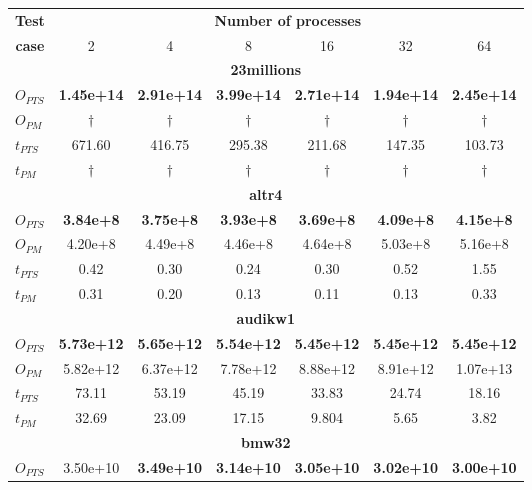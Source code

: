 \documentclass[fleqn,12pt,twoside]{article}
\begin{document}
\begin{table}[hbt]
\begin{center}
  \begin{tabular}{|l||c|c|c|c|c|c|}
    \hline
    \multicolumn{1}{|c||}{{\bf Test}} &
    \multicolumn{6}{c|}{{\bf Number of processes}}\\
    \cline{2-7}
     \multicolumn{1}{|c||}{{\bf case}} & 2 & 4 & 8 & 16 & 32 & 64 \\
    \hline
    \hline
    \multicolumn{7}{|c|}{{\bf 23millions}} \\
    \hline
    $O_{PTS}$ & \textbf{1.45e+14} & \textbf{2.91e+14} & \textbf{3.99e+14} & \textbf{2.71e+14} & \textbf{1.94e+14} & \textbf{2.45e+14} \\
    $O_{PM}$  & $\dag$  &$\dag$ & $\dag$ & $\dag$ & $\dag$ & $\dag$   \\
    $t_{PTS}$ & 671.60 & 416.75 & 295.38 & 211.68 & 147.35 & 103.73 \\
    $t_{PM}$  & $\dag$  &$\dag$ & $\dag$ & $\dag$ & $\dag$ & $\dag$ \\
    \hline
    \multicolumn{7}{|c|}{{\bf altr4}} \\
    \hline
    $O_{PTS}$ & \textbf{3.84e+8}  & \textbf{3.75e+8}  & \textbf{3.93e+8}  & \textbf{3.69e+8}  & \textbf{4.09e+8}  & \textbf{4.15e+8}   \\
    $O_{PM}$  & 4.20e+8  & 4.49e+8  & 4.46e+8  & 4.64e+8  & 5.03e+8  & 5.16e+8  \\
    $t_{PTS}$ & 0.42     & 0.30     & 0.24     & 0.30     & 0.52     & 1.55     \\
    $t_{PM}$  & 0.31     & 0.20     & 0.13     & 0.11     & 0.13     & 0.33	\\
    \hline
    \multicolumn{7}{|c|}{{\bf audikw1}} \\
    \hline
    $O_{PTS}$ & \textbf{5.73e+12} & \textbf{5.65e+12} & \textbf{5.54e+12} & \textbf{5.45e+12} & \textbf{5.45e+12} & \textbf{5.45e+12} \\
    $O_{PM}$  &  5.82e+12  & 6.37e+12 & 7.78e+12 & 8.88e+12 & 8.91e+12 & 1.07e+13 \\
    $t_{PTS}$ & 73.11    & 53.19   & 45.19    & 33.83   &  24.74    & 18.16   \\
    $t_{PM}$  & 32.69    & 23.09    & 17.15    & 9.804    & 5.65     & 3.82     \\
    \hline
\multicolumn{7}{|c|}{{\bf bmw32}} \\
    \hline
    $O_{PTS}$ & 3.50e+10 & \textbf{3.49e+10} & \textbf{3.14e+10} & \textbf{3.05e+10}  & \textbf{3.02e+10} & \textbf{3.00e+10} \\

\end{tabular}
\end{center}
\end{table}
\end{document}
